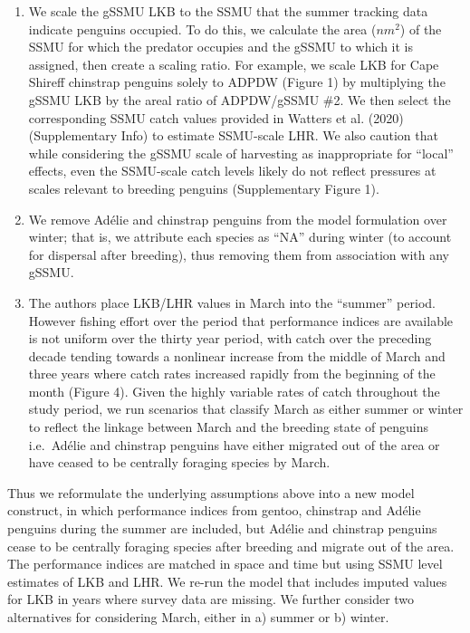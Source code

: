 \documentclass[]{elsarticle} %
\providecommand{\tightlist}{%
  \setlength{\itemsep}{0pt}\setlength{\parskip}{0pt}}
\begin{document}
\begin{enumerate}
\def\labelenumi{\arabic{enumi}.}
\tightlist
\item
  We scale the gSSMU LKB to the SSMU that the summer tracking data
  indicate penguins occupied. To do this, we calculate the area
  (\(nm^2\)) of the SSMU for which the predator occupies and the gSSMU
  to which it is assigned, then create a scaling ratio. For example, we
  scale LKB for Cape Shireff chinstrap penguins solely to ADPDW (Figure
  1) by multiplying the gSSMU LKB by the areal ratio of ADPDW/gSSMU \#2.
  We then select the corresponding SSMU catch values provided in Watters
  et al. (2020) (Supplementary Info) to estimate SSMU-scale LHR. We also
  caution that while considering the gSSMU scale of harvesting as
  inappropriate for ``local'' effects, even the SSMU-scale catch levels
  likely do not reflect pressures at scales relevant to breeding
  penguins (Supplementary Figure 1).\\
\item
  We remove Adélie and chinstrap penguins from the model formulation
  over winter; that is, we attribute each species as ``NA'' during
  winter (to account for dispersal after breeding), thus removing them
  from association with any gSSMU.\\
\item
  The authors place LKB/LHR values in March into the ``summer'' period.
  However fishing effort over the period that performance indices are
  available is not uniform over the thirty year period, with catch over
  the preceding decade tending towards a nonlinear increase from the
  middle of March and three years where catch rates increased rapidly
  from the beginning of the month (Figure 4). Given the highly variable
  rates of catch throughout the study period, we run scenarios that
  classify March as either summer or winter to reflect the linkage
  between March and the breeding state of penguins i.e.~Adélie and
  chinstrap penguins have either migrated out of the area or have ceased
  to be centrally foraging species by March.
\end{enumerate}

Thus we reformulate the underlying assumptions above into a new model
construct, in which performance indices from gentoo, chinstrap and
Adélie penguins during the summer are included, but Adélie and chinstrap
penguins cease to be centrally foraging species after breeding and
migrate out of the area. The performance indices are matched in space
and time but using SSMU level estimates of LKB and LHR. We re-run the
model that includes imputed values for LKB in years where survey data
are missing. We further consider two alternatives for considering March,
either in a) summer or b) winter.
\end{document}
